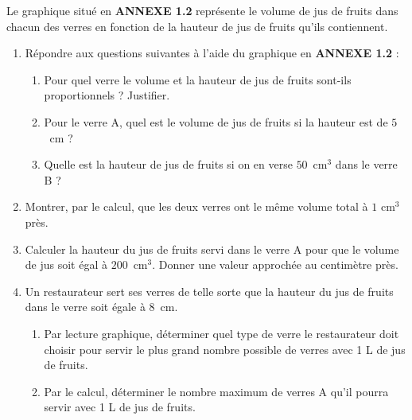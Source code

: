 \documentclass[10pt]{article}
\begin{document}
Le graphique situé en \textbf{ANNEXE 1.2} représente le volume de jus de fruits dans chacun des verres en fonction de la hauteur de jus de fruits qu'ils contiennent.

\medskip

\begin{enumerate}
\item Répondre aux questions suivantes à l'aide du graphique en \textbf{ANNEXE 1.2} :
	\begin{enumerate}
		\item Pour quel verre le volume et la hauteur de jus de fruits sont-ils proportionnels ? Justifier.
		\item Pour le verre A, quel est le volume de jus de fruits si la hauteur est de $5$~cm ?
		\item Quelle est la hauteur de jus de fruits si on en verse $50$~cm$^3$ dans le verre B ?
 	\end{enumerate}
\item  Montrer, par le calcul, que les deux verres ont le même volume total à $1$ cm$^3$ près.
\item  Calculer la hauteur du jus de fruits servi dans le verre A pour que le volume de jus soit égal à $200$~cm$^3$. Donner une valeur approchée au centimètre près.
\item  Un restaurateur sert ses verres de telle sorte que la hauteur du jus de fruits dans le verre soit égale à $8$~cm.
	\begin{enumerate}
		\item Par lecture graphique, déterminer quel type de verre le restaurateur doit choisir pour servir le plus grand nombre possible de verres avec 1 L de jus de fruits.
		\item Par le calcul, déterminer le nombre maximum de verres A qu'il pourra servir avec 1 L de jus de fruits.
	\end{enumerate}
\end{enumerate}
\end{document}
